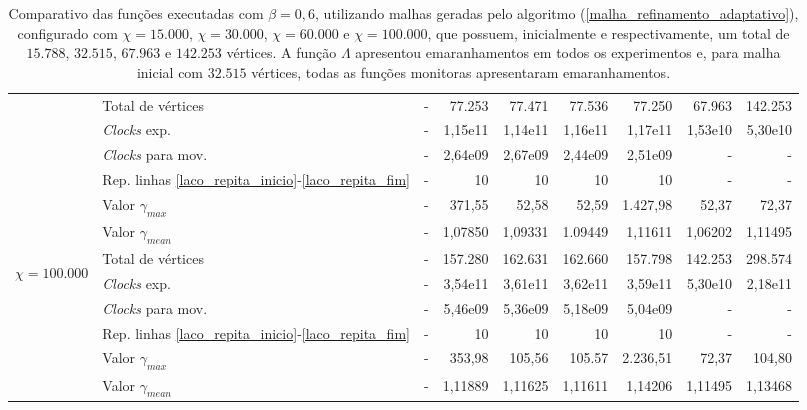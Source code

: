 \begin{table}
\begin{center}
\begin{tabular}{|c|l|r|r|r|r|r|r|r|}
& Total de vértices                                                     & - & 77.253 & 77.471 & 77.536 & 77.250 & 67.963 & 142.253 \\
& {\it Clocks} exp.	                                             	& - & 1,15e11 & 1,14e11 & 1,16e11 & 1,17e11 & 1,53e10  & 5,30e10 \\
& {\it Clocks} para mov.                                      		& - & 2,64e09 & 2,67e09 & 2,44e09 & 2,51e09 & - & - \\
& Rep. linhas \ref{laco_repita_inicio}-\ref{laco_repita_fim} 		& - & 10 & 10 & 10 & 10 & - & - \\
& Valor $\gamma_{max}$							& - & 371,55 & 52,58 & 52,59 & 1.427,98 & 52,37 & 72,37 \\
& Valor $\gamma_{mean}$							& - & 1,07850 & 1,09331 & 1.09449 & 1,11611 &  1,06202 & 1,11495 \\
\hline %
\multirow{5}{*}{\begin{sideways}$\chi = 100.000$\end{sideways} } 
& Total de vértices                                                     & - & 157.280 & 162.631 & 162.660 & 157.798 & 142.253 & 298.574 \\
& {\it Clocks} exp.	                                             	& - & 3,54e11 & 3,61e11 & 3,62e11 & 3,59e11 & 5,30e10 & 2,18e11 \\
& {\it Clocks} para mov.                                      		& - & 5,46e09 & 5,36e09 & 5,18e09 & 5,04e09 & - & - \\
& Rep. linhas \ref{laco_repita_inicio}-\ref{laco_repita_fim} 		& - & 10 & 10 & 10 & 10 & - & - \\
& Valor $\gamma_{max}$							& - & 353,98 & 105,56 & 105.57 & 2.236,51 & 72,37 & 104,80 \\
& Valor $\gamma_{mean}$							& - & 1,11889 & 1,11625 & 1,11611 & 1,14206 & 1,11495 & 1,13468 \\
\hline %
\end{tabular}%
\end{center}
\caption{Comparativo das funções executadas com $\beta = 0,6$, utilizando malhas geradas pelo algoritmo (\ref{malha_refinamento_adaptativo}), configurado com $\chi = 15.000$, $\chi = 30.000$, $\chi = 60.000$ e $\chi = 100.000$, que possuem, inicialmente e respectivamente, um total de $15.788$, $32.515$, $67.963$ e $142.253$ vértices. A função $\Lambda$ apresentou emaranhamentos em todos os experimentos e, para malha inicial com $32.515$ vértices, todas as funções monitoras apresentaram emaranhamentos.} %
\label{tabelaComparativo_beta_6}
\end{table}

